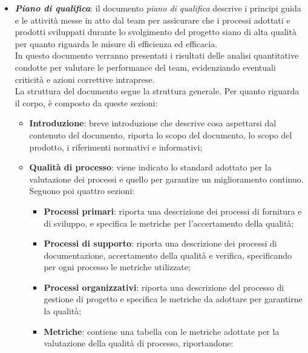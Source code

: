 \begin{itemize}
            \item \textit{\textbf{Piano di qualifica}}: il documento \textit{piano di qualifica} descrive i principi guida e le attività messe in atto dal team per assicurare che i processi adottati e prodotti sviluppati durante lo svolgimento del progetto siano di alta qualità per quanto riguarda le misure di efficienza ed efficacia.\\
            In questo documento verranno presentati i risultati delle analisi quantitative condotte per valutare le performance del team, evidenziando eventuali criticità e azioni correttive intraprese.
            \\La struttura del documento segue la struttura generale. Per quanto riguarda il corpo, è composto da queste sezioni:
            \begin{itemize}
                \item \textbf{Introduzione}: breve introduzione che descrive cosa aspettarsi dal contenuto del documento, riporta lo scopo del documento, lo scopo del prodotto, i riferimenti normativi e informativi;
                \item \textbf{Qualità di processo}: viene indicato lo standard adottato per la valutazione dei processi e quello per garantire un miglioramento continuo.\\
                                                    Seguono poi quattro sezioni:
                                                    \begin{itemize}
                                                        \item \textbf{Processi primari}: riporta una descrizione dei processi di fornitura e di sviluppo, e specifica le metriche per l'accertamento della qualità;
                                                        \item \textbf{Processi di supporto}: riporta una descrizione dei processi di documentazione, accertamento della qualità e verifica, specificando per ogni processo le metriche utilizzate; 
                                                        \item \textbf{Processi organizzativi}: riporta una descrizione del processo di gestione di progetto e specifica le metriche da adottare per garantirne la qualità;
                                                        \item \textbf{Metriche}: contiene una tabella con le metriche adottate per la valutazione della qualità di processo, riportandone:
                                                        \begin{itemize}

\end{itemize}
\end{itemize}
\end{itemize}
\end{itemize}
